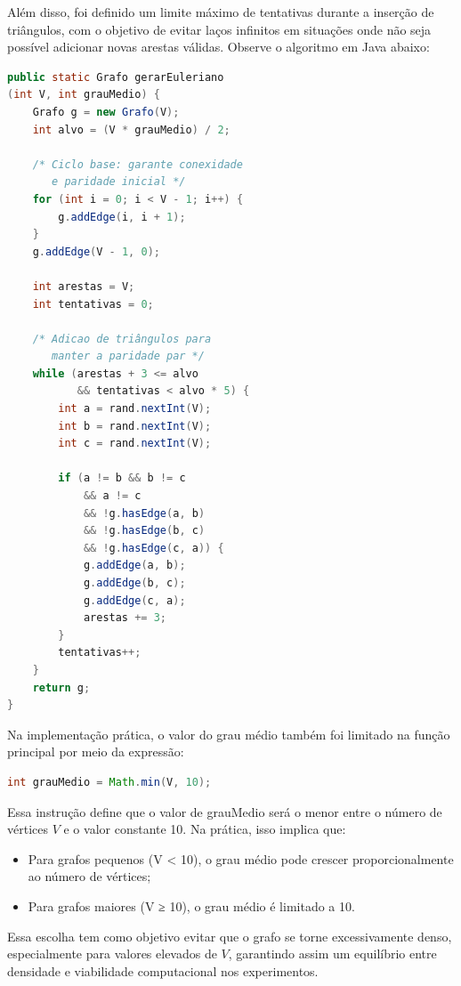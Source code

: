\documentclass{sbc2023}%
\begin{document}
Além disso, foi definido um limite máximo de tentativas durante a inserção de triângulos, com o objetivo de evitar laços infinitos em situações onde não seja possível adicionar novas arestas válidas. Observe o algoritmo em Java abaixo:

\begin{lstlisting}[language=Java, caption={Algoritmo Construtivo para Grafos Eulerianos}]
public static Grafo gerarEuleriano
(int V, int grauMedio) {
    Grafo g = new Grafo(V);
    int alvo = (V * grauMedio) / 2;

    /* Ciclo base: garante conexidade 
       e paridade inicial */
    for (int i = 0; i < V - 1; i++) {
        g.addEdge(i, i + 1);
    }
    g.addEdge(V - 1, 0);

    int arestas = V;
    int tentativas = 0;

    /* Adicao de triângulos para 
       manter a paridade par */
    while (arestas + 3 <= alvo 
           && tentativas < alvo * 5) {
        int a = rand.nextInt(V);
        int b = rand.nextInt(V);
        int c = rand.nextInt(V);

        if (a != b && b != c 
            && a != c 
            && !g.hasEdge(a, b) 
            && !g.hasEdge(b, c) 
            && !g.hasEdge(c, a)) {
            g.addEdge(a, b);
            g.addEdge(b, c);
            g.addEdge(c, a);
            arestas += 3;
        }
        tentativas++;
    }
    return g;
}
\end{lstlisting}

Na implementação prática, o valor do grau médio também foi limitado na função principal por meio da expressão:

\begin{lstlisting}[language=Java]
   int grauMedio = Math.min(V, 10);
\end{lstlisting}

Essa instrução define que o valor de grauMedio será o menor entre o número de vértices $V$ e o valor constante 10. Na prática, isso implica que:

    \begin{itemize}
        \item Para grafos pequenos (V < 10), o grau médio pode crescer proporcionalmente ao número de vértices;
        \item Para grafos maiores (V ≥ 10), o grau médio é limitado a 10.
    \end{itemize}

Essa escolha tem como objetivo evitar que o grafo se torne excessivamente denso, especialmente para valores elevados de $V$, garantindo assim um equilíbrio entre densidade e viabilidade computacional nos experimentos.
\end{document}
